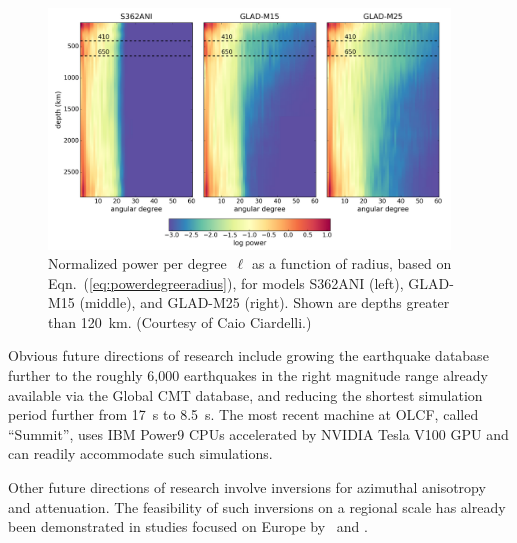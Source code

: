 \begin{figure}
  \centering
  \includegraphics[width=0.95\textwidth]{ch-GLADM25/figures/power_radius.pdf}
  \caption[Normalized power spectrum]
  {\small{Normalized power per degree~$\ell$ as a function of radius, based on Eqn.~(\ref{eq:powerdegreeradius}), for models S362ANI (left), GLAD-M15 (middle), and GLAD-M25 (right).
  Shown are depths greater than 120~km.
  (Courtesy of Caio Ciardelli.)
  }}
  \label{fig:powerspectraradius}
\end{figure}


Obvious future directions of research include growing the earthquake database further to the roughly 6,000 earthquakes in the right magnitude range already available via the Global CMT database,
and reducing the shortest simulation period further from 17~s to 8.5~s.
The most recent machine at OLCF, called ``Summit'', uses IBM Power9 CPUs accelerated by NVIDIA Tesla V100 GPU and can readily accommodate such simulations.

Other future directions of research involve inversions for azimuthal anisotropy
and attenuation.
The feasibility of such inversions on a regional scale has already been demonstrated in studies focused on Europe by~\cite{ZhuTromp2013} and \cite{Zhuetal2013}.

